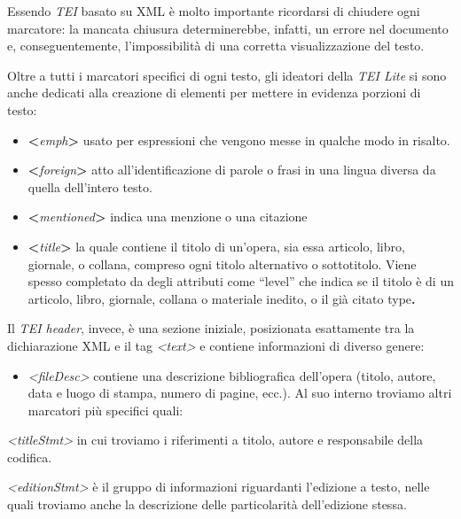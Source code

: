\documentclass[
  b5paper,
  twoside,
  11pt,
  chapterprefix=false,
  bibliography=totocnumbered,
  listof=flat]{scrbook}
\providecommand{\tightlist}{%
  \setlength{\itemsep}{0pt}\setlength{\parskip}{0pt}}
\begin{document}
Essendo \emph{TEI} basato su XML è molto importante ricordarsi di chiudere
ogni marcatore: la mancata chiusura determinerebbe, infatti, un errore
nel documento e, conseguentemente, l'impossibilità di una corretta
visualizzazione del testo.

Oltre a tutti i marcatori specifici di ogni testo, gli ideatori della
\emph{TEI Lite} si sono anche dedicati alla creazione di elementi per mettere
in evidenza porzioni di testo:

\begin{itemize}
\item
  \textbf{\textless{}}\emph{emph}\textbf{\textgreater{}} usato per espressioni che vengono messe in
  qualche modo in risalto.
\item
  \textbf{\textless{}}\emph{foreign}\textbf{\textgreater{}} atto all'identificazione di parole o frasi in
  una lingua diversa da quella dell'intero testo.
\item
  \textbf{\textless{}}\emph{mentioned}\textbf{\textgreater{}} indica una menzione o una citazione
\item
  \textbf{\textless{}}\emph{title}\textbf{\textgreater{}} la quale contiene il titolo di un'opera, sia
  essa articolo, libro, giornale, o collana, compreso ogni titolo
  alternativo o sottotitolo. Viene spesso completato da degli
  attributi come \enquote{level} che indica se il titolo è di un articolo,
  libro, giornale, collana o materiale inedito, o il già citato
  type\textbf{.}
\end{itemize}

Il \emph{TEI header}, invece, è una sezione iniziale, posizionata esattamente
tra la dichiarazione XML e il tag \emph{\textless text\textgreater{}} e contiene informazioni di
diverso genere:

\begin{itemize}
\tightlist
\item
  \emph{\textless fileDesc\textgreater{}} contiene una descrizione bibliografica dell'opera
  (titolo, autore, data e luogo di stampa, numero di pagine, ecc.). Al
  suo interno troviamo altri marcatori più specifici quali:
\end{itemize}

\emph{\textless titleStmt\textgreater{}} in cui troviamo i riferimenti a titolo, autore e
responsabile della codifica.

\emph{\textless editionStmt\textgreater{}} è il gruppo di informazioni riguardanti l'edizione a
testo, nelle quali troviamo anche la descrizione delle particolarità
dell'edizione stessa.
\end{document}
